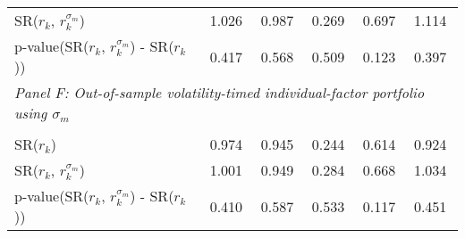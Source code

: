 \begin{tabular}{llllll}
SR($r_k$, $r_k^{\sigma_m}$) & 1.026 & 0.987 & 0.269 & 0.697 & 1.114 \\
p-value(SR($r_k$, $r_k^{\sigma_m}$) - SR($r_k$)) & 0.417 & 0.568 & 0.509 & 0.123 & 0.397 \\
\multicolumn{7}{l}{\textit{Panel F: Out-of-sample volatility-timed individual-factor portfolio using $\sigma_m$}} \\ &  &  &  &  &  \\
SR($r_k$) & 0.974 & 0.945 & 0.244 & 0.614 & 0.924 \\
SR($r_k$, $r_k^{\sigma_m}$) & 1.001 & 0.949 & 0.284 & 0.668 & 1.034 \\
p-value(SR($r_k$, $r_k^{\sigma_m}$) - SR($r_k$)) & 0.410 & 0.587 & 0.533 & 0.117 & 0.451 \\
\bottomrule
\end{tabular}
